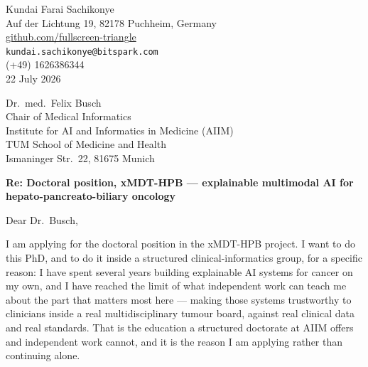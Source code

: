 \documentclass[12pt,a4paper]{article}
\begin{document}
\begin{flushright}
Kundai Farai Sachikonye \\
Auf der Lichtung 19, 82178 Puchheim, Germany \\
\href{https://github.com/fullscreen-triangle}{github.com/fullscreen-triangle} \\
\texttt{kundai.sachikonye@bitspark.com} \\
(+49) 1626386344 \\[6pt]
22 July 2026
\end{flushright}

\vspace{1em}

Dr.\ med.\ Felix Busch \\
Chair of Medical Informatics \\
Institute for AI and Informatics in Medicine (AIIM) \\
TUM School of Medicine and Health \\
Ismaninger Str.\ 22, 81675 Munich

\vspace{1.5em}

\textbf{Re: Doctoral position, xMDT-HPB --- explainable multimodal AI for
hepato-pancreato-biliary oncology}

\vspace{1em}

Dear Dr.\ Busch,

I am applying for the doctoral position in the xMDT-HPB project.
I want to do this PhD, and to do it inside a structured clinical-informatics
group, for a specific reason: I have spent several years building explainable
AI systems for cancer on my own, and I have reached the limit of what
independent work can teach me about the part that matters most here ---
making those systems trustworthy to clinicians inside a real multidisciplinary
tumour board, against real clinical data and real standards.
That is the education a structured doctorate at AIIM offers and independent
work cannot, and it is the reason I am applying rather than continuing alone.
\end{document}
